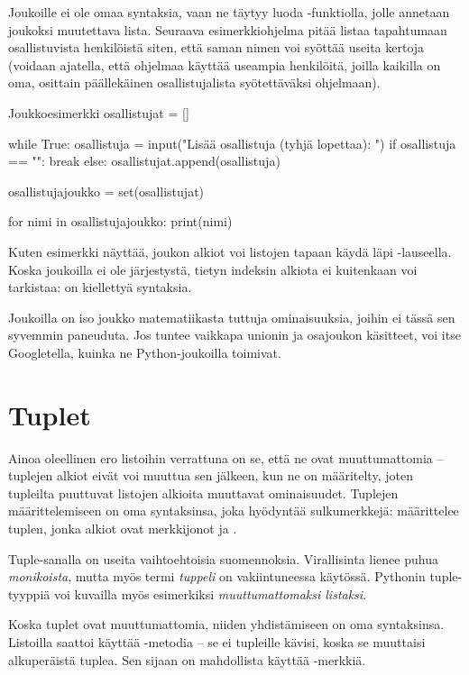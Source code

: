 Joukoille ei ole omaa syntaksia, vaan ne täytyy luoda -funktiolla, jolle annetaan joukoksi muutettava lista. Seuraava esimerkkiohjelma pitää listaa tapahtumaan osallistuvista henkilöistä siten, että saman nimen voi syöttää useita kertoja (voidaan ajatella, että ohjelmaa käyttää useampia henkilöitä, joilla kaikilla on oma, osittain päällekäinen osallistujalista syötettäväksi ohjelmaan).

\begin{example}{Joukkoesimerkki}
osallistujat = []

while True:
	osallistuja = input("Lisää osallistuja (tyhjä lopettaa): ")
	if osallistuja == "":
		break
	else:
		osallistujat.append(osallistuja)

osallistujajoukko = set(osallistujat)

for nimi in osallistujajoukko:
	print(nimi)
\end{example}

Kuten esimerkki näyttää, joukon alkiot voi listojen tapaan käydä läpi -lauseella. Koska joukoilla ei ole järjestystä, tietyn indeksin alkiota ei kuitenkaan voi tarkistaa:  on kiellettyä syntaksia.

Joukoilla on iso joukko matematiikasta tuttuja ominaisuuksia, joihin ei tässä sen syvemmin paneuduta. Jos tuntee vaikkapa unionin ja osajoukon käsitteet, voi itse Googletella, kuinka ne Python-joukoilla toimivat.

\section{Tuplet}

Ainoa  oleellinen ero listoihin verrattuna on se, että ne ovat muuttumattomia -- tuplejen alkiot eivät voi muuttua sen jälkeen, kun ne on määritelty, joten tupleilta puuttuvat listojen alkioita muuttavat ominaisuudet. Tuplejen määrittelemiseen on oma syntaksinsa, joka hyödyntää sulkumerkkejä:  määrittelee tuplen, jonka alkiot ovat merkkijonot  ja .

Tuple-sanalla on useita vaihtoehtoisia suomennoksia. Virallisinta lienee puhua \textit{monikoista}, mutta myös termi \textit{tuppeli} on vakiintuneessa käytössä. Pythonin tuple-tyyppiä voi kuvailla myös esimerkiksi \textit{muuttumattomaksi listaksi}.

Koska tuplet ovat muuttumattomia, niiden yhdistämiseen on oma syntaksinsa. Listoilla saattoi käyttää -metodia -- se ei tupleille kävisi, koska se muuttaisi alkuperäistä tuplea. Sen sijaan on mahdollista käyttää \code{+}-merkkiä.

